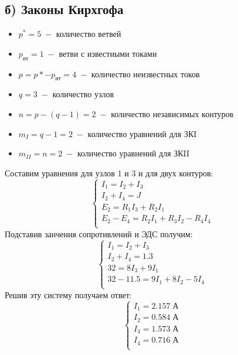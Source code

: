 \documentclass[12pt,fleqn]{article}
\begin{document}
\begin{justify}
    \subsection{б) Законы Кирхгофа}
    \begin{itemize}
        \item $p^* = 5 \;- $ количество ветвей
        \item $ p_\text{ит} = 1 \; - $ ветви с известными токами
        \item $ p = p* - p_\text{ит} = 4 \; - $ количество неизвестных токов
        \item $ q = 3 \; - $ количество узлов
        \item $ n = p - (q - 1) = 2 \; - $ количество независимых контуров
        \item $ m_I = q - 1 = 2 \; - $ количество уравнений для ЗКI
        \item $ m_{II} = n = 2 \; - $ количество уравнений для ЗКII
    \end{itemize}
    Составим уравнения для узлов 1 и 3 и для двух контуров:
    \begin{equation}
        \begin{cases}
            I_1 = I_2 + I_3 \\
            I_2 + I_4 = J \\
            E_2 = R_1I_3 + R_2I_1 \\
            E_2 - E_4 = R_2I_1 + R_3I_2 - R_4I_4 \\
        \end{cases}
    \end{equation}
    Подставив занчения сопротивлений и ЭДС получим:
    \begin{equation}
        \begin{cases}
            I_1 = I_2 + I_3 \\
            I_2 + I_4 = 1.3 \\
            32 = 8I_3 + 9I_1 \\
            32 - 11.5 = 9I_1 + 8I_2 - 5I_4 \\
        \end{cases}
    \end{equation}
    Решив эту систему получаем ответ:
    \begin{equation}
        \begin{cases}
            I_1 = 2.157 \; \text{А} \\
            I_2 = 0.584 \; \text{А} \\
            I_3 = 1.573 \; \text{А} \\
            I_4 = 0.716 \; \text{А} \\
        \end{cases}
    \end{equation}
    

\end{justify}
\end{document}
